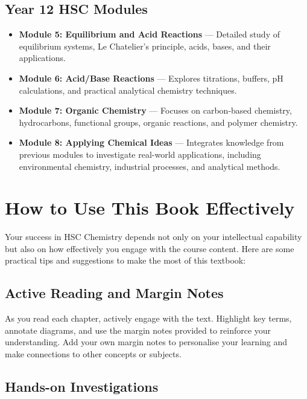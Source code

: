 \subsection{Year 12 HSC Modules}
\FloatBarrier
\FloatBarrier
\FloatBarrier

\begin{itemize}
\item \textbf{Module 5: Equilibrium and Acid Reactions} — Detailed study of equilibrium systems, Le Chatelier’s principle, acids, bases, and their applications.
\item \textbf{Module 6: Acid/Base Reactions} — Explores titrations, buffers, pH calculations, and practical analytical chemistry techniques.
\item \textbf{Module 7: Organic Chemistry} — Focuses on carbon-based chemistry, hydrocarbons, functional groups, organic reactions, and polymer chemistry.
\item \textbf{Module 8: Applying Chemical Ideas} — Integrates knowledge from previous modules to investigate real-world applications, including environmental chemistry, industrial processes, and analytical methods.
\end{itemize}

\section{How to Use This Book Effectively}
\FloatBarrier
\FloatBarrier
\FloatBarrier

Your success in HSC Chemistry depends not only on your intellectual capability but also on how effectively you engage with the course content. Here are some practical tips and suggestions to make the most of this textbook:

\subsection{Active Reading and Margin Notes}
\FloatBarrier
\FloatBarrier
\FloatBarrier

As you read each chapter, actively engage with the text. Highlight key terms, annotate diagrams, and use the margin notes provided to reinforce your understanding. Add your own margin notes to personalise your learning and make connections to other concepts or subjects.


\subsection{Hands-on Investigations}
\FloatBarrier
\FloatBarrier
\FloatBarrier

